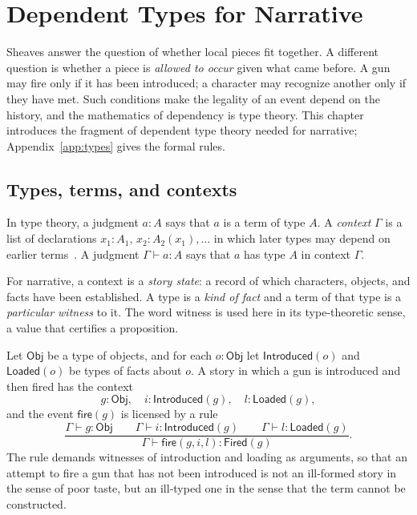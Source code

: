 \chapter{Dependent Types for Narrative}
\label{ch:types}

Sheaves answer the question of whether local pieces fit together. A different question is whether a piece is \emph{allowed to occur} given what came before. A gun may fire only if it has been introduced; a character may recognize another only if they have met. Such conditions make the legality of an event depend on the history, and the mathematics of dependency is type theory. This chapter introduces the fragment of dependent type theory needed for narrative; Appendix~\ref{app:types} gives the formal rules.

\section{Types, terms, and contexts}

In type theory, a judgment $a:A$ says that $a$ is a term of type $A$. A \emph{context} $\Gamma$ is a list of declarations $x_1:A_1,\,x_2:A_2(x_1),\dots$ in which later types may depend on earlier terms~\cite{martinlof1984}. A judgment $\Gamma\vdash a:A$ says that $a$ has type $A$ in context $\Gamma$.

For narrative, a context is a \emph{story state}: a record of which characters, objects, and facts have been established. A type is a \emph{kind of fact} and a term of that type is a \emph{particular witness} to it. The word witness is used here in its type-theoretic sense, a value that certifies a proposition.

\begin{example}\label{ex:chekhov}
Let $\mathsf{Obj}$ be a type of objects, and for each $o:\mathsf{Obj}$ let $\mathsf{Introduced}(o)$ and $\mathsf{Loaded}(o)$ be types of facts about $o$. A story in which a gun is introduced and then fired has the context
\[
g:\mathsf{Obj},\quad i:\mathsf{Introduced}(g),\quad l:\mathsf{Loaded}(g),
\]
and the event $\mathsf{fire}(g)$ is licensed by a rule
\[
\frac{\Gamma\vdash g:\mathsf{Obj}\qquad\Gamma\vdash i:\mathsf{Introduced}(g)\qquad\Gamma\vdash l:\mathsf{Loaded}(g)}{\Gamma\vdash\mathsf{fire}(g,i,l):\mathsf{Fired}(g)}.
\]
The rule demands witnesses of introduction and loading as arguments, so that an attempt to fire a gun that has not been introduced is not an ill-formed story in the sense of poor taste, but an ill-typed one in the sense that the term cannot be constructed.
\end{example}


